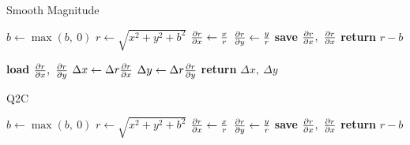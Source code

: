 \begin{algorithm}[tb]
\caption{Smooth Magnitude}\label{alg:ch3:mag_smooth}
\begin{algorithmic}[1]
  \State $b \gets \max(b,\ 0)$
  \State $r \gets \sqrt{x^2 + y^2 + b^2}$
  \State $\frac{\partial r}{\partial x} \gets \frac{x}{r}$
  \State $\frac{\partial r}{\partial y} \gets \frac{y}{r}$
  \State \textbf{save} $\dydx{r}{x},\ \dydx{r}{x}$
  \State \textbf{return} $r - b$
\EndFunction
\end{algorithmic}\vspace{10pt}
\begin{algorithmic}[1]
  \State \textbf{load} $\dydx{r}{x},\ \dydx{r}{y}$
  \State $\Delta x \gets \Delta r \frac{\partial r}{\partial x}$
  \State $\Delta y \gets \Delta r \frac{\partial r}{\partial y}$
  \State \textbf{return} $\Delta x,\ \Delta y$
\EndFunction
\end{algorithmic}
\end{algorithm}

\begin{algorithm}[tb]
\caption{Q2C}\label{alg:ch3:q2c}
\begin{algorithmic}[1]
  \State $b \gets \max(b,\ 0)$
  \State $r \gets \sqrt{x^2 + y^2 + b^2}$
  \State $\frac{\partial r}{\partial x} \gets \frac{x}{r}$
  \State $\frac{\partial r}{\partial y} \gets \frac{y}{r}$
  \State \textbf{save} $\dydx{r}{x},\ \dydx{r}{x}$
  \State \textbf{return} $r - b$
\EndFunction
\end{algorithmic}\vspace{10pt}
\end{algorithm}
